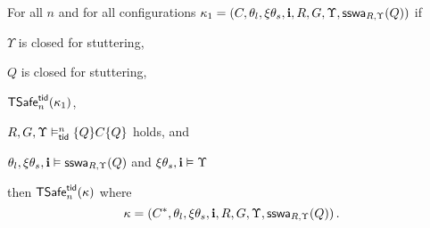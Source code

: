 \begin{lemma}[Iter]\label{lem:iter}
For all $n$ and for all 
configurations $\kappa_1=(C,\theta_l,\xi\theta_s,\intp,R,G,\Upsilon, \sswa{Q}{R}{\Upsilon})$
if  
\begin{compactenum}[(i)]
\item \label{lem:iter:stutter}
$\Upsilon$ is closed for stuttering, 
\item \label{lem:iter:stutterq} 
$Q$ is closed for stuttering, 
\item \label{lem:iter:safen}
$\safe_n(\kappa_1)$,
\item \label{lem:iter:valid}
$R,G,\Upsilon \vDash^n_{\ltid} \{Q\} C \{ Q \}$ holds, and
\item \label{lem:iter:prepost}
$\theta_l,\xi\theta_s,\intp \vDash \sswa{Q}{R}{\Upsilon}$ and $\xi\theta_s,\intp \vDash \Upsilon$
\end{compactenum}
then  $\safe_n(\kappa)$ where 
$$\kappa=(C^*,\theta_l,\xi\theta_s,\intp,R,G,\Upsilon, \sswa{Q}{R}{\Upsilon})\,.$$
\end{lemma}


